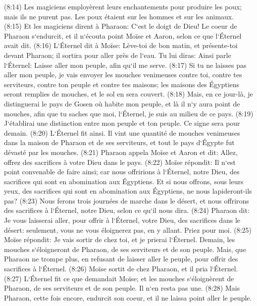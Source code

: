 \verse (8:14) Les magiciens employèrent leurs enchantements pour produire les poux; mais ils ne purent pas. Les poux étaient sur les hommes et sur les animaux. 
\verse (8:15) Et les magiciens dirent à Pharaon: C`est le doigt de Dieu! Le coeur de Pharaon s`endurcit, et il n`écouta point Moïse et Aaron, selon ce que l`Éternel avait dit. 
\verse (8:16) L`Éternel dit à Moïse: Lève-toi de bon matin, et présente-toi devant Pharaon; il sortira pour aller près de l`eau. Tu lui diras: Ainsi parle l`Éternel: Laisse aller mon peuple, afin qu`il me serve. 
\verse (8:17) Si tu ne laisses pas aller mon peuple, je vais envoyer les mouches venimeuses contre toi, contre tes serviteurs, contre ton peuple et contre tes maisons; les maisons des Égyptiens seront remplies de mouches, et le sol en sera couvert. 
\verse (8:18) Mais, en ce jour-là, je distinguerai le pays de Gosen où habite mon peuple, et là il n`y aura point de mouches, afin que tu saches que moi, l`Éternel, je suis au milieu de ce pays. 
\verse (8:19) J`établirai une distinction entre mon peuple et ton peuple. Ce signe sera pour demain. 
\verse (8:20) L`Éternel fit ainsi. Il vint une quantité de mouches venimeuses dans la maison de Pharaon et de ses serviteurs, et tout le pays d`Égypte fut dévasté par les mouches. 
\verse (8:21) Pharaon appela Moïse et Aaron et dit: Allez, offrez des sacrifices à votre Dieu dans le pays. 
\verse (8:22) Moïse répondit: Il n`est point convenable de faire ainsi; car nous offririons à l`Éternel, notre Dieu, des sacrifices qui sont en abomination aux Égyptiens. Et si nous offrons, sous leurs yeux, des sacrifices qui sont en abomination aux Égyptiens, ne nous lapideront-ils pas? 
\verse (8:23) Nous ferons trois journées de marche dans le désert, et nous offrirons des sacrifices à l`Éternel, notre Dieu, selon ce qu`il nous dira. 
\verse (8:24) Pharaon dit: Je vous laisserai aller, pour offrir à l`Éternel, votre Dieu, des sacrifices dans le désert: seulement, vous ne vous éloignerez pas, en y allant. Priez pour moi. 
\verse (8:25) Moïse répondit: Je vais sortir de chez toi, et je prierai l`Éternel. Demain, les mouches s`éloigneront de Pharaon, de ses serviteurs et de son peuple. Mais, que Pharaon ne trompe plus, en refusant de laisser aller le peuple, pour offrir des sacrifices à l`Éternel. 
\verse (8:26) Moïse sortit de chez Pharaon, et il pria l`Éternel. 
\verse (8:27) L`Éternel fit ce que demandait Moïse; et les mouches s`éloignèrent de Pharaon, de ses serviteurs et de son peuple. Il n`en resta pas une. 
\verse (8:28) Mais Pharaon, cette fois encore, endurcit son coeur, et il ne laissa point aller le peuple. 

